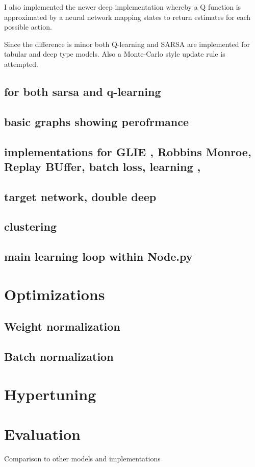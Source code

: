 I also implemented the newer deep implementation whereby a Q
function is approximated by a neural network mapping 
states to return estimates for each possible action. 

Since the difference is minor both Q-learning and SARSA are
implemented for tabular and deep type models. Also a 
Monte-Carlo style update rule is attempted. 

\subsection{ for both sarsa and q-learning}
\subsection{ basic graphs showing perofrmance}
\subsection{implementations for GLIE , Robbins Monroe, Replay BUffer, batch loss, learning , }
\subsection{target network, double deep}
\subsection{}
\subsection{clustering }
\subsection{main learning loop within Node.py}
\section{Optimizations}
\subsection{Weight normalization}
\subsection{Batch normalization}
\section{Hypertuning}
\section{Evaluation}
Comparison to other models and implementations


